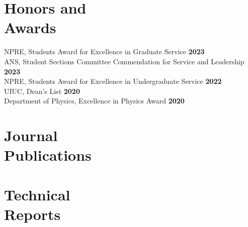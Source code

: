 \documentclass[margin,line]{resume}
\begin{document}
\begin{resume}
    \section{\mysidestyle Honors and\\Awards}
                NPRE, Students Award for Excellence in Graduate Service \hfill \textbf{2023}\vspace{.5mm}\\%
                ANS, Student Sections Committee Commendation for Service and Leadership \hfill \textbf{2023}\vspace{.5mm}\\%
                NPRE, Students Award for Excellence in Undergraduate Service \hfill \textbf{2022}\vspace{.5mm}\\%
                UIUC, Dean's List \hfill \textbf{2020}\vspace{.5mm}\\%
                Department of Physics, Excellence in Physics Award \hfill \textbf{2020}\vspace{.5mm}\\%

    \vspace{-4mm}
    \section{\mysidestyle Journal\\Publications}
      \begin{bibenum}
      \item {}
      \end{bibenum}
    \section{\mysidestyle Technical\\Reports}
    \begin{bibenum}
       \item {}
    \end{bibenum}

\end{resume}
\end{document}
